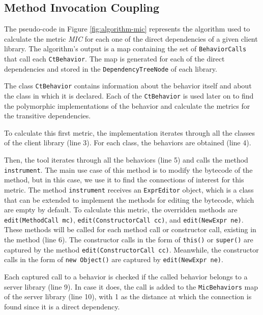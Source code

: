 \subsection{Method Invocation Coupling}
The pseudo-code in Figure \ref{fig:algorithm-mic} represents the algorithm used to calculate the metric \textit{MIC} for each one of the direct dependencies of a given client library. The algorithm's output is a map containing the set of \texttt{BehaviorCalls} that call each \texttt{CtBehavior}. The map is generated for each of the direct dependencies and stored in the \texttt{DependencyTreeNode} of each library.

The class \texttt{CtBehavior} contains information about the behavior itself and about the class in which it is declared. Each of the \texttt{CtBehavior} is used later on to find the polymorphic implementations of the behavior and calculate the metrics for the transitive dependencies.

To calculate this first metric, the implementation iterates through all the classes of the client library (line 3). For each class, the behaviors are obtained (line 4).

Then, the tool iterates through all the behaviors (line 5) and calls the method \texttt{instrument}. The main use case of this method is to modify the bytecode of the method, but in this case, we use it to find the connections of interest for this metric. The method \texttt{instrument} receives an \texttt{ExprEditor} object, which is a class that can be extended to implement the methods for editing the bytecode, which are empty by default. To calculate this metric, the overridden methods are \texttt{edit(MethodCall mc)}, \texttt{edit(ConstructorCall cc)}, and \texttt{edit(NewExpr ne)}. These methods will be called for each method call or constructor call, existing in the method (line 6). The constructor calls in the form of \texttt{this()} or \texttt{super()} are captured by the method \texttt{edit(ConstructorCall cc)}. Meanwhile, the constructor calls in the form of \texttt{new Object()} are captured by \texttt{edit(NewExpr ne)}.

Each captured call to a behavior is checked if the called behavior belongs to a server library (line 9). In case it does, the call is added to the \texttt{MicBehaviors} map of the server library (line 10), with 1 as the distance at which the connection is found since it is a direct dependency.

